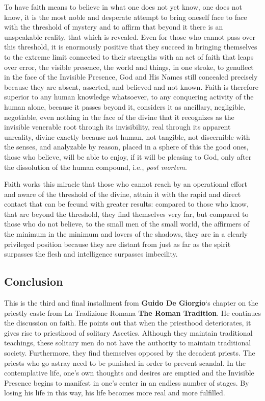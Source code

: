 To have faith means to believe in what one does not yet know, one does not know, it is the most noble and desperate attempt to bring oneself face to face with the threshold of mystery and to affirm that beyond it there is an unspeakable reality, that which is revealed. Even for those who cannot pass over this threshold, it is enormously positive that they succeed in bringing themselves to the extreme limit connected to their strengths with an act of faith that leaps over error, the visible presence, the world and things, in one stroke, to genuflect in the face of the Invisible Presence, God and His Names still concealed precisely because they are absent, asserted, and believed and not known. Faith is therefore superior to any human knowledge whatsoever, to any conquering activity of the human alone, because it passes beyond it, considers it as ancillary, negligible, negotiable, even nothing in the face of the divine that it recognizes as the invisible venerable root through its invisibility, real through its apparent unreality, divine exactly because not human, not tangible, not discernible with the senses, and analyzable by reason, placed in a sphere of this the good ones, those who believe, will be able to enjoy, if it will be pleasing to God, only after the dissolution of the human compound, i.e., \emph{post mortem}.

Faith works this miracle that those who cannot reach by an operational effort and aware of the threshold of the divine, attain it with the rapid and direct contact that can be fecund with greater results: compared to those who know, that are beyond the threshold, they find themselves very far, but compared to those who do not believe, to the small men of the small world, the affirmers of the minimum in the minimum and lovers of the shadows, they are in a clearly privileged position because they are distant from just as far as the spirit surpasses the flesh and intelligence surpasses imbecility.

\subsection*{Conclusion}

\begin{quotex}
This is the third and final installment from \textbf{Guido De Giorgio}`s chapter on the priestly caste from La Tradizione Romana \textbf{The Roman Tradition}. He continues the discussion on faith. He points out that when the priesthood deteriorates, it gives rise to priesthood of solitary Ascetics. Although they maintain traditional teachings, these solitary men do not have the authority to maintain traditional society. Furthermore, they find themselves opposed by the decadent priests. The priests who go astray need to be punished in order to prevent scandal. In the contemplative life, one's own thoughts and desires are emptied and the Invisible Presence begins to manifest in one's center in an endless number of stages. By losing his life in this way, his life becomes more real and more fulfilled.
\end{quotex}


